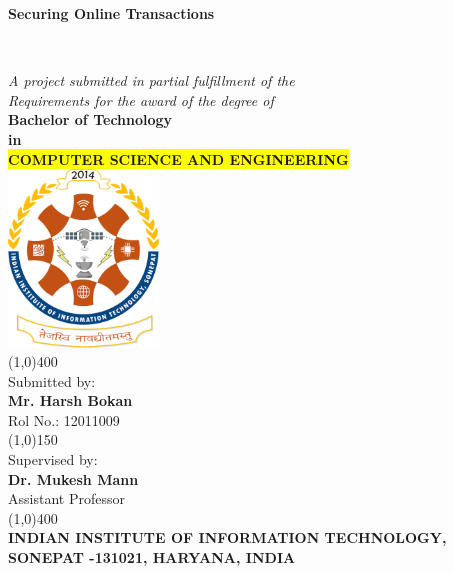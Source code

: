 \documentclass[12pt, oneside, a4paper]{article}
\begin{document}
\begin{center}
    \vspace{0.1cm}
    \begin{Large}\textbf{Securing Online Transactions}\end{Large}\\
    \vspace{1cm}\begin{large}
    \textit{A project submitted in partial fulfillment of the\\
    Requirements for the award of the degree of}\\
    \vspace{0.8cm}
    \textbf{Bachelor of Technology\\ in}\\
    \textbf{\colorbox{yellow}{COMPUTER SCIENCE AND ENGINEERING}}\\
    \vspace{0.6cm}
    \includegraphics[width=0.3\textwidth]{Clg_logo.png}\\
    \vspace{1cm}
    \line(1,0){400}\\\vspace{0.3cm}
    Submitted by:\\
    \textbf{Mr. Harsh Bokan}\\Rol No.: 12011009\\
    \vspace{0.5cm}
    \line(1,0){150}\\
    \vspace{0.5cm}
    Supervised by:\\
    \textbf{Dr. Mukesh Mann}\\
    Assistant Professor\\
    \line(1,0){400}\\
    \vspace{2cm}
    \textbf{INDIAN INSTITUTE OF INFORMATION TECHNOLOGY,\\
    SONEPAT -131021, HARYANA, INDIA}\\\end{large}
\end{center}
\end{document}
